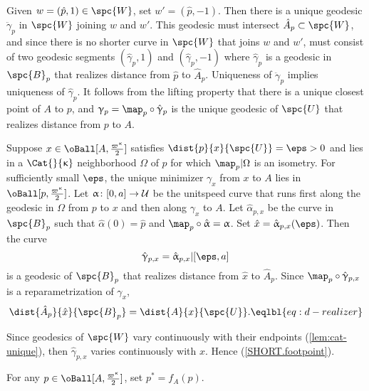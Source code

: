 Given $w=(\hat p,1)\in \spc{W}$, set $w'=(\hat p,- 1)$.  Then there is a unique geodesic $\ddot\gamma_p$ in $\spc{W}$ joining $w$ and $w'$.  This geodesic must intersect $\hat A_p\subset \spc{W}$, and since there is no shorter curve in $\spc{W}$ that joins $w$ and $w'$, must consist of two geodesic segments $(\hat \gamma_p,1)$ and $(\hat\gamma_p, -1)$ where $\hat \gamma_p$ is a geodesic in $\spc{B}_p$  that realizes distance from $\hat p$ to  $\hat A_p$.  Uniqueness of $\ddot\gamma_p$ implies uniqueness of $\hat \gamma_p$.  It follows from the lifting property  that there is a unique closest point of $A$ to $p$, and  $\gamma_p=\map_p\circ\hat\gamma_p$ is the unique geodesic of $\spc{U}$ that realizes distance from $p$ to $A$.

Suppose $x\in \oBall[A,\tfrac{\varpi\kappa}{2}]$ satisfies $ \dist{p}{x}{\spc{U}}=\eps>0$ and lies in a $\Cat{}{\kappa}$ 
 neighborhood $\Omega$ of $p$ for which $\map_p|\Omega$ is an isometry. For sufficiently small $\eps $,  the unique minimizer $\gamma_x$ from $x$ to $A$ lies in $ \oBall[p,\tfrac{\varpi\kappa}{2}]$.    Let $\alpha\:[0,a]\to\spc{U}$ be the unitspeed curve that runs first  along  the geodesic in $\Omega$  from $p$ to $x$ and then along $\gamma_x$ to $A$. Let $\hat\alpha_{p,x}$ be the curve in $\spc{B}_p$ such that  $\hat\alpha (0) = \hat p$ and $\map_p\circ\hat\alpha=\alpha$.  Set $\hat x =\hat\alpha_{p,x} (\eps)$.  Then the curve
\[
\hat\gamma_{p,x} =\hat\alpha_{p,x} |[\eps, a]
\]
 is a geodesic of $\spc{B}_p$ that  realizes distance from $\hat x$ to  $\hat A_p$.  
Since  $\map_p\circ\hat\gamma_{p,x}$ is a reparametrization of $\gamma_x$,
\[
\dist{\hat A_p}{\hat x}{\spc{B}_p}= \dist{A}{ x}{\spc{U}}. 
\eqlbl{eq:d-realizer}
\]
 
Since geodesics of  $\spc{W}$ vary continuously with their endpoints (\ref{lem:cat-unique}), then $\hat\gamma_{p,x}$ varies continuously with $x$.
Hence (\ref{SHORT.footpoint}).\qeds


For any $p\in \oBall[A,\tfrac{\varpi\kappa}{2}]$, set $ p^*=f_A( p )$. 


